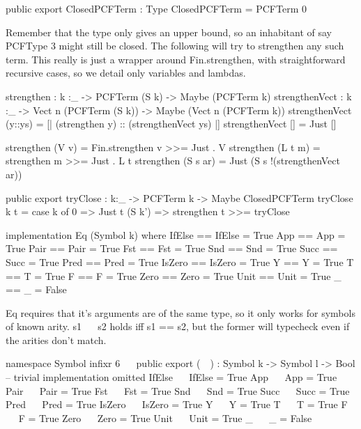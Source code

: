 \begin{code}
public export
ClosedPCFTerm : Type
ClosedPCFTerm = PCFTerm 0
\end{code}

Remember that the type only gives an upper bound, so an inhabitant of say PCFType 3 might still
be closed. The following will try to strengthen any such term.
This really is just a wrapper around Fin.strengthen, with straightforward recursive cases, so we
detail only variables and lambdas.

\begin{code}
strengthen : {k :_} -> PCFTerm (S k) -> Maybe (PCFTerm k)
strengthenVect : {k :_} -> Vect n (PCFTerm (S k)) -> Maybe (Vect n (PCFTerm k))
strengthenVect (y::ys) = [| (strengthen y) :: (strengthenVect ys) |]
strengthenVect [] = Just []
\end{code}

\begin{code}
strengthen (V v)    = Fin.strengthen v >>= Just . V
strengthen (L t m)  = strengthen m     >>= Just . L t
strengthen (S s ar) = Just (S s !(strengthenVect ar))
\end{code}

\begin{code}
public export
tryClose : {k:_} -> PCFTerm k -> Maybe ClosedPCFTerm
tryClose {k} t = case k of
                 0      => Just t
                 (S k') => strengthen t >>= tryClose
\end{code}

\begin{hidden}
implementation Eq (Symbol k) where
  IfElse == IfElse = True
  App    == App    = True
  Pair   == Pair   = True
  Fst    == Fst    = True
  Snd    == Snd    = True
  Succ   == Succ   = True
  Pred   == Pred   = True
  IsZero == IsZero = True
  Y      == Y      = True
  T      == T      = True
  F      == F      = True
  Zero   == Zero   = True
  Unit   == Unit   = True
  _      == _      = False
\end{hidden}

Eq requires that it's arguments are of the same type, so it only works for symbols of known arity.
s1 ~~ s2 holds iff s1 == s2, but the former will typecheck even if the arities don't match.

\begin{code}
namespace Symbol
  infixr 6 ~~
  public export
  (~~) : Symbol k -> Symbol l -> Bool
  -- trivial implementation omitted
  IfElse ~~ IfElse = True
  App    ~~ App    = True
  Pair   ~~ Pair   = True
  Fst    ~~ Fst    = True
  Snd    ~~ Snd    = True
  Succ   ~~ Succ   = True
  Pred   ~~ Pred   = True
  IsZero ~~ IsZero = True
  Y      ~~ Y      = True
  T      ~~ T      = True
  F      ~~ F      = True
  Zero   ~~ Zero   = True
  Unit   ~~ Unit   = True
  _      ~~ _      = False
\end{code}

